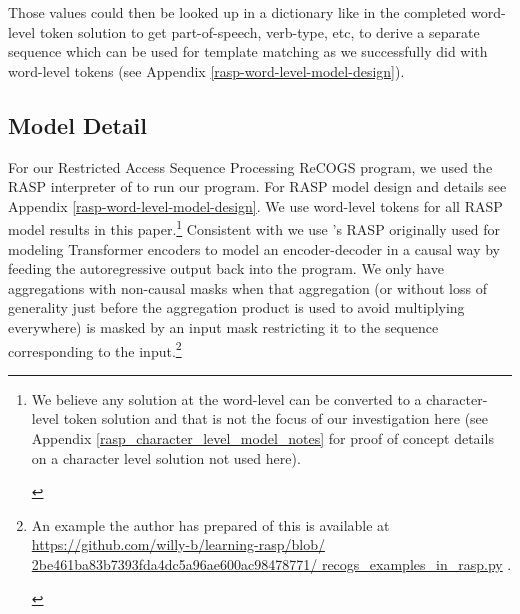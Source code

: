 \documentclass[11pt]{article}
\begin{document}
Those values could then be looked up in a dictionary like in the completed word-level token solution to get part-of-speech, verb-type, etc, to derive a separate sequence which can be used for template matching as we successfully did with word-level tokens (see Appendix \ref{rasp-word-level-model-design}).


\clearpage

\subsection{Model Detail}
\label{model_detail}

For our Restricted Access Sequence Processing ReCOGS program, we used the RASP interpreter of \citep{Weiss2021} to run our program. For RASP model design and details see Appendix \ref{rasp-word-level-model-design}. We use word-level tokens for all RASP model results in this paper.\footnote{\begin{footnotesize}We believe any solution at the word-level can be converted to a character-level token solution and that is not the focus of our investigation here (see Appendix \ref{rasp_character_level_model_notes} for proof of concept details on a character level solution not used here).\end{footnotesize}}
Consistent with \citep{Zhou2024} we use \citep{Weiss2021}'s RASP originally used for modeling Transformer encoders to model an encoder-decoder in a causal way by feeding the autoregressive output back into the program. We only have aggregations with non-causal masks when that aggregation (or without loss of generality just before the aggregation product is used to avoid multiplying everywhere) is masked by an input mask restricting it to the sequence corresponding to the input.\footnote{\begin{footnotesize}An example the author has prepared of this is available at 
\href{https://github.com/willy-b/learning-rasp/blob/2be461ba83b7393fda4dc5a96ae600ac98478771/recogs\_examples\_in\_rasp.py}{https://github.com/willy-b/learning-rasp/blob/
2be461ba83b7393fda4dc5a96ae600ac98478771/
recogs\_examples\_in\_rasp.py}
.\end{footnotesize}}
\end{document}
